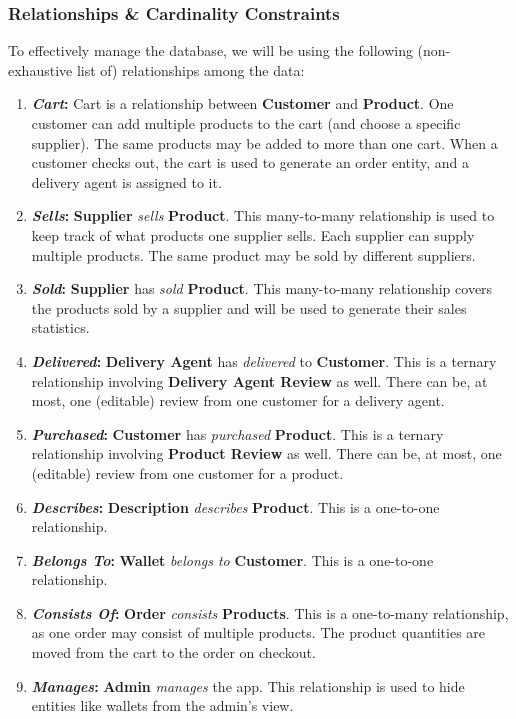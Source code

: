 \documentclass[12pt]{report}
\begin{document}
    \subsubsection*{Relationships \& Cardinality Constraints}
    To effectively manage the database, we will be using the following (non-exhaustive list of) relationships among the data:
    \begin{enumerate}
        \item \textbf{\textit{Cart}:}
        Cart is a relationship between \textbf{Customer} and \textbf{Product}.
        One customer can add multiple products to the cart (and choose a specific supplier).
        The same products may be added to more than one cart. When a customer checks out, the cart is used to generate an order entity,
        and a delivery agent is assigned to it.
        \item \textbf{\textit{Sells}:}
        \textbf{Supplier} \textit{sells} \textbf{Product}.
        This many-to-many relationship is used to keep track of what products one supplier sells.
        Each supplier can supply multiple products. The same product may be sold by different suppliers.
        \item \textbf{\textit{Sold}:}
        \textbf{Supplier} has \textit{sold} \textbf{Product}.
        This many-to-many relationship covers the products sold by a supplier and will be used to generate their sales statistics.
        \item \textbf{\textit{Delivered}:}
        \textbf{Delivery Agent} has \textit{delivered} to \textbf{Customer}.
        This is a ternary relationship involving \textbf{Delivery Agent Review} as well.
        There can be, at most, one (editable) review from one customer for a delivery agent.
        \item \textbf{\textit{Purchased}:}
        \textbf{Customer} has \textit{purchased} \textbf{Product}.
        This is a ternary relationship involving \textbf{Product Review} as well.
        There can be, at most, one (editable) review from one customer for a product.
        \item \textbf{\textit{Describes}:}
        \textbf{Description} \textit{describes} \textbf{Product}.
        This is a one-to-one relationship.
        \item \textbf{\textit{Belongs To}:}
        \textbf{Wallet} \textit{belongs to} \textbf{Customer}.
        This is a one-to-one relationship.
        \item \textbf{\textit{Consists Of}:}
        \textbf{Order} \textit{consists} \textbf{Products}.
        This is a one-to-many relationship, as one order may consist of multiple products. The product quantities are moved from the cart to the order on checkout.
        \item \textbf{\textit{Manages}:}
        \textbf{Admin} \textit{manages} the app.
        This relationship is used to hide entities like wallets from the admin's view.
    \end{enumerate}
\end{document}
